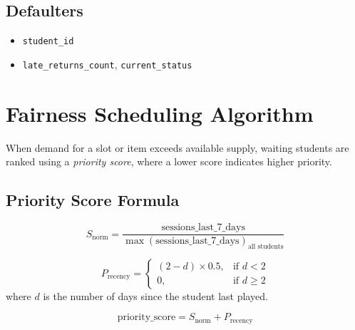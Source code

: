 \documentclass{article}
\begin{document}
\subsection{Defaulters}
\begin{itemize}
    \item \texttt{student\_id}
    \item \texttt{late\_returns\_count}, \texttt{current\_status}
\end{itemize}

\section{Fairness Scheduling Algorithm}
\label{sec:fairness}
When demand for a slot or item exceeds available supply, waiting students are ranked using a \emph{priority score}, where a lower score indicates higher priority.

\subsection{Priority Score Formula}
\begin{equation}
    S_{\text{norm}} = \frac{\text{sessions\_last\_7\_days}}{\max(\text{sessions\_last\_7\_days})_{\text{all students}}}
\end{equation}

\begin{equation}
    P_{\text{recency}} =
    \begin{cases}
        (2 - d) \times 0.5, & \text{if } d < 2 \\
        0, & \text{if } d \geq 2
    \end{cases}
\end{equation}
where $d$ is the number of days since the student last played.

\begin{equation}
    \text{priority\_score} = S_{\text{norm}} + P_{\text{recency}}
\end{equation}
\end{document}

